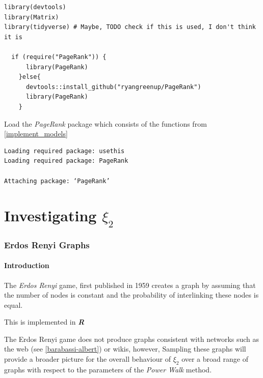 \documentclass[11pt]{article}
\begin{document}
\begin{listing}[htbp]
\begin{verbatim}
library(devtools)
library(Matrix)
library(tidyverse) # Maybe, TODO check if this is used, I don't think it is

  if (require("PageRank")) {
      library(PageRank)
    }else{
      devtools::install_github("ryangreenup/PageRank")
      library(PageRank)
    }

\end{verbatim}
\caption{\label{}Load the \emph{PageRank} package which consists of the functions from \ref{implement_models}}
\end{listing}

\begin{verbatim}
Loading required package: usethis
Loading required package: PageRank

Attaching package: ‘PageRank’
\end{verbatim}


\part{Investigating \(\xi_{2}\)}
\section{Erdos Renyi Graphs}
\label{erdos-renyi}
\subsection{Introduction}
\label{sec:org1cdabe4}
The \emph{Erdos Renyi} game, first published in 1959 \cite{renyiRandomGraphs1959} creates a graph by assuming that the number of nodes is constant and the probability of interlinking these nodes is equal.

This is implemented in \textbf{\emph{R}} \cite[IgraphManualPagesa]{IgraphManualPages}

The Erdos Renyi game does not produce graphs consistent with networks such as
the web (see \ref{barabassi-albert}) or wikis, however, Sampling these graphs will
provide a broader picture for the overall behaviour of \(\xi_{2}\) over a broad
range of graphs with respect to the parameters of the \emph{Power Walk} method.
\end{document}
